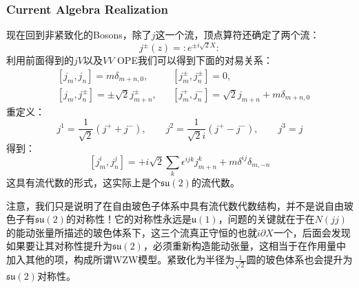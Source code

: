 \subsubsection{Current Algebra Realization}
现在回到非紧致化的Bosons，除了$j$这一个流，顶点算符还确定了两个流：
\begin{equation}
	j^\pm(z)=:e^{\pm i\sqrt{2}X}:
\end{equation}
利用前面得到的$jV$以及$VV$ OPE我们可以得到下面的对易关系：
\begin{equation}
	\boxed{
		\begin{aligned}
			&\left[j_m,j_n\right]=m\delta_{m+n,0},&&\left[j_m^\pm,j_n^\pm\right]=0,\\
			&\left[j_m,j_n^\pm\right]=\pm\sqrt{2}j_{m+n}^\pm,&&\left[j_m^+,j_n^-\right]=\sqrt{2}j_{m+n}+m\delta_{m+n,0}
		\end{aligned}
	}
\end{equation}
重定义：
\begin{equation}
	j^1=\frac1{\sqrt{2}}\left(j^++j^-\right),\quad\quad j^2=\frac1{\sqrt{2}i}\left(j^+-j^-\right),\quad\quad j^3=j
\end{equation}
得到：
\begin{equation}\label{35.37}
	\boxed{
		\left[j_m^i,j_n^j\right]=+i\sqrt{2}\sum_k\epsilon^{ijk}j_{m+n}^k+m\delta^{ij}\delta_{m,-n}
	}
\end{equation}
这具有流代数的形式，这实际上是个$\mathfrak{su}(2)$的流代数。
\begin{remark}
	注意，我们只是说明了在自由玻色子体系中具有流代数代数结构，并不是说自由玻色子有$\mathfrak{su}(2)$的对称性！它的对称性永远是$\mathfrak{u}(1)$，问题的关键就在于在$N(jj)$的能动张量所描述的玻色体系下，这三个流真正守恒的也就$i\partial X$一个，后面会发现如果要让其对称性提升为$\mathfrak{su}(2)$，必须重新构造能动张量，这相当于在作用量中加入其他的项，构成所谓WZW模型。紧致化为半径为$\frac{1}{\sqrt{2}}$圆的玻色体系也会提升为$\mathfrak{su}(2)$对称性。
\end{remark}
